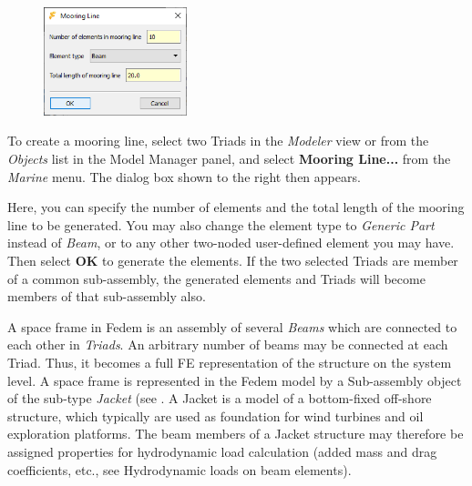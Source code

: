 
\vskip23mm
  \vskip-10mm

\begin{figure}
  \baselineskip
  \includegraphics[width=0.37\textwidth]{Figures/Dialogs/4-MooringLine}
\end{figure}

\noindent To create a mooring line, select two Triads in \newline
the {\sl Modeler} view or from the {\sl Objects} list in \newline
the Model Manager panel, and select \newline
\textbf{Mooring Line...} from the {\sl Marine} menu.
The dialog box shown to the right then appears.

Here, you can specify the number of elements and the total length of the mooring
line to be generated. You may also change the element type to {\sl Generic Part}
instead of {\sl Beam}, or to any other two-noded user-defined element you may
have. Then select \textbf{OK} to generate the elements.
If the two selected Triads are member of a common sub-assembly, the generated
elements and Triads will become members of that sub-assembly also.



A space frame in Fedem is an assembly of several {\sl Beams}
which are connected to each other in {\sl Triads}.
An arbitrary number of beams may be connected at each Triad.
Thus, it becomes a full FE representation of the structure on the system level.
A space frame is represented in the Fedem model by a Sub-assembly object of the
sub-type {\sl Jacket} (see .
A Jacket is a model of a bottom-fixed off-shore structure, which typically are
used as foundation for wind turbines and oil exploration platforms.
The beam members of a Jacket structure may therefore be assigned properties for
hydrodynamic load calculation (added mass and drag coefficients, etc.,
see 
               {Hydrodynamic loads on beam elements}).


